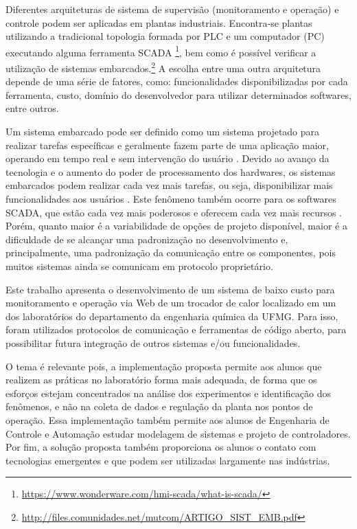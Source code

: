 	Diferentes arquiteturas de sistema de supervisão (monitoramento e operação) e controle podem ser aplicadas em plantas industriais. Encontra-se plantas utilizando a tradicional topologia formada por PLC e um computador (PC) executando alguma ferramenta SCADA \footnote{\url{https://www.wonderware.com/hmi-scada/what-is-scada/}}, bem como é possível verificar a utilização de sistemas embarcados.\footnote{\url{http://files.comunidades.net/mutcom/ARTIGO_SIST_EMB.pdf}} A escolha entre uma outra arquitetura depende de uma série de fatores, como: funcionalidades disponibilizadas por cada ferramenta, custo, domínio do desenvolvedor para utilizar determinados softwares, entre outros.
	
	Um sistema embarcado pode ser definido como um sistema projetado para realizar tarefas específicas e geralmente fazem parte de uma aplicação maior, operando em tempo real e sem intervenção do usuário \cite{baskiyar2005}.  Devido ao avanço da tecnologia e o aumento do poder de processamento dos hardwares, os sistemas embarcados podem realizar cada vez mais tarefas, ou seja, disponibilizar mais funcionalidades aos usuários \cite{luiz2011}. Este fenômeno também ocorre para os softwares SCADA, que estão cada vez mais poderosos e oferecem cada vez mais recursos \cite{david2017}. Porém, quanto maior é a variabilidade de opções de projeto disponível, maior é a dificuldade de se alcançar uma padronização no desenvolvimento e, principalmente, uma padronização da comunicação entre os componentes, pois muitos sistemas ainda se comunicam em protocolo proprietário.
	
	Este trabalho apresenta o desenvolvimento de um sistema de baixo custo para monitoramento e operação via Web de um trocador de calor localizado em um dos laboratórios do departamento da engenharia química da UFMG. Para isso, foram utilizados protocolos de comunicação e ferramentas de código aberto, para possibilitar futura integração de outros sistemas e/ou funcionalidades.
	
	O tema é relevante pois, a implementação proposta permite aos alunos que realizem as práticas no laboratório forma mais adequada, de forma que os esforços estejam concentrados na análise dos experimentos e identificação dos fenômenos, e não na coleta de dados e regulação da planta nos pontos de operação. Essa implementação também permite aos alunos de Engenharia de Controle e Automação estudar modelagem de sistemas e projeto de controladores. Por fim, a solução proposta também proporciona os alunos o contato com tecnologias emergentes e que podem ser utilizadas largamente nas indústrias.  
	
